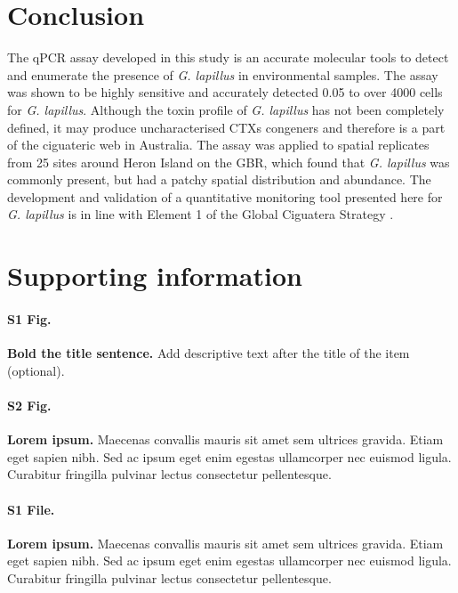 \documentclass[10pt,letterpaper]{article}
\begin{document}
\section*{Conclusion}

The qPCR assay developed in this study is an accurate molecular tools to detect and enumerate the presence of \emph{G. lapillus}
in environmental samples. 
The assay was shown to be highly sensitive and accurately detected 0.05 to over 4000 cells for \emph{G. lapillus}. 
Although the toxin profile of \emph{G. lapillus} has not been completely defined, it may produce uncharacterised CTXs congeners \cite{kretzschmar2017characterization,larsson2018toxicology} and therefore is a part of the ciguateric web in Australia.
The assay was applied to spatial replicates from 25 sites around Heron Island on the GBR, which found that \textit{G. lapillus} was commonly present, but had a patchy spatial distribution and abundance. 
The development and validation of a quantitative monitoring tool presented here for \textit{G. lapillus} is in line with Element 1 of the Global Ciguatera Strategy \cite{globalcig}.

\section*{Supporting information}

\paragraph*{S1 Fig.}
\label{S1_Fig}
{\bf Bold the title sentence.} Add descriptive text after the title of the item (optional).

\paragraph*{S2 Fig.}
\label{S2_Fig}
{\bf Lorem ipsum.} Maecenas convallis mauris sit amet sem ultrices gravida. Etiam eget sapien nibh. Sed ac ipsum eget enim egestas ullamcorper nec euismod ligula. Curabitur fringilla pulvinar lectus consectetur pellentesque.

\paragraph*{S1 File.}
\label{S1_File}
{\bf Lorem ipsum.}  Maecenas convallis mauris sit amet sem ultrices gravida. Etiam eget sapien nibh. Sed ac ipsum eget enim egestas ullamcorper nec euismod ligula. Curabitur fringilla pulvinar lectus consectetur pellentesque.
\end{document}

